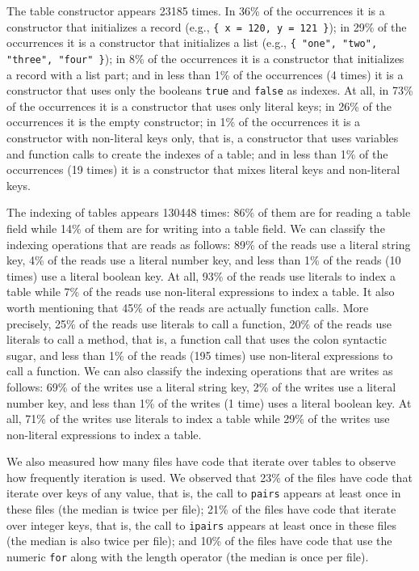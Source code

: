 The table constructor appears 23185 times.
In 36\% of the occurrences it is a constructor that initializes a
record (e.g., \texttt{\{ x = 120, y = 121 \}});
in 29\% of the occurrences it is a constructor that initializes a
list (e.g., \texttt{\{ "one", "two", "three", "four" \}});
in 8\% of the occurrences it is a constructor that initializes a
record with a list part;
and in less than 1\% of the occurrences (4 times) it is a constructor
that uses only the booleans \texttt{true} and \texttt{false} as indexes.
At all, in 73\% of the occurrences it is a constructor that uses
only literal keys;
in 26\% of the occurrences it is the empty constructor;
in 1\% of the occurrences it is a constructor with non-literal keys
only, that is, a constructor that uses variables and function calls
to create the indexes of a table;
and in less than 1\% of the occurrences (19 times) it is a constructor
that mixes literal keys and non-literal keys.

The indexing of tables appears 130448 times:
86\% of them are for reading a table field while
14\% of them are for writing into a table field.
We can classify the indexing operations that are reads as follows:
89\% of the reads use a literal string key,
4\% of the reads use a literal number key,
and less than 1\% of the reads (10 times) use a literal boolean key.
At all, 93\% of the reads use literals to index a table while
7\% of the reads use non-literal expressions to index a table.
It also worth mentioning that 45\% of the reads are actually
function calls.
More precisely, 25\% of the reads use literals to call a function,
20\% of the reads use literals to call a method, that is,
a function call that uses the colon syntactic sugar, 
and less than 1\% of the reads (195 times) use non-literal expressions
to call a function.
We can also classify the indexing operations that are writes as follows: 
69\% of the writes use a literal string key,
2\% of the writes use a literal number key,
and less than 1\% of the writes (1 time) uses a literal boolean key.
At all, 71\% of the writes use literals to index a table while
29\% of the writes use non-literal expressions to index a table.

We also measured how many files have code that iterate over tables to
observe how frequently iteration is used.
We observed that 23\% of the files have code that iterate over keys
of any value, that is, the call to \texttt{pairs} appears at least
once in these files (the median is twice per file);
21\% of the files have code that iterate over integer keys, that is,
the call to \texttt{ipairs} appears at least once in these files
(the median is also twice per file);
and 10\% of the files have code that use the numeric \texttt{for}
along with the length operator (the median is once per file).

